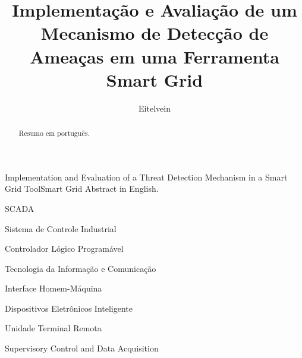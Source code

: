 \documentclass[cic,tc]{iiufrgs}
\title{Implementação e Avaliação de um Mecanismo de Detecção de Ameaças em uma Ferramenta Smart Grid}
\author{Eitelvein}{Luiza dos Santos}
\begin{document}
\maketitle





\begin{abstract}
    Resumo em português.
\end{abstract}

\begin{englishabstract}{Implementation and Evaluation of a Threat Detection Mechanism in a Smart Grid Tool}{Smart Grid}
    Abstract in English.
\end{englishabstract}



\begin{listofabbrv}{SCADA}
    \item[SCI]   Sistema de Controle Industrial
    \item[CLP]   Controlador Lógico Programável
    \item[TIC]   Tecnologia da Informação e Comunicação
    \item[HMI]   Interface Homem-Máquina
    \item[DEI]   Dispositivos Eletrônicos Inteligente
    \item[UTR]   Unidade Terminal Remota
    \item[SCADA] Supervisory Control and Data Acquisition
    
\end{listofabbrv}
\end{document}

